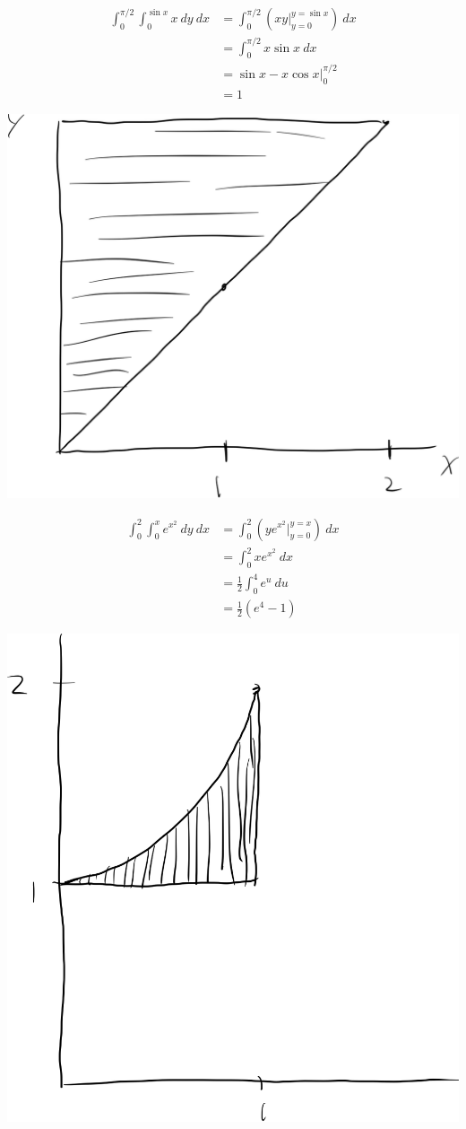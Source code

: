 \documentclass[10pt]{extarticle}
\begin{document}
\begin{problem}{16.2}
\begin{description}[font=\normalfont]
      \item[12:]
        \begin{align*}
          \int_{0}^{\pi/2}\int_{0}^{\sin x}x~dy~dx &= \int_{0}^{\pi/2}\left(xy\biggr\vert_{y=0}^{y=\sin x}\right)~dx\\
                                                   &= \int_{0}^{\pi/2}x\sin x~dx\\
                                                   &= \sin x - x\cos x\biggr\vert_{0}^{\pi/2}\\
                                                   &= 1
        \end{align*}
      \item[14:]\hfill
        \begin{center}
          \includegraphics[height=0.5\textwidth]{images/16_2_14.png}
        \end{center}
        \begin{align*}
          \int_{0}^{2}\int_{0}^{x}e^{x^2}~dy~dx &= \int_{0}^{2}\left(ye^{x^2}\biggr\vert_{y=0}^{y=x}\right)~dx\\
                                                &= \int_{0}^{2}xe^{x^2}~dx\\
                                                &= \frac{1}{2}\int_{0}^{4}e^{u}~du \tag*{$u = x^2,~du = 2x~dx$}\\
                                                &= \frac{1}{2}\left(e^4 - 1\right)
        \end{align*}
      \item[20:]
        \begin{center}
          \includegraphics[height=0.5\textwidth]{images/16_2_20.png}

\end{center}
\end{description}
\end{problem}
\end{document}
